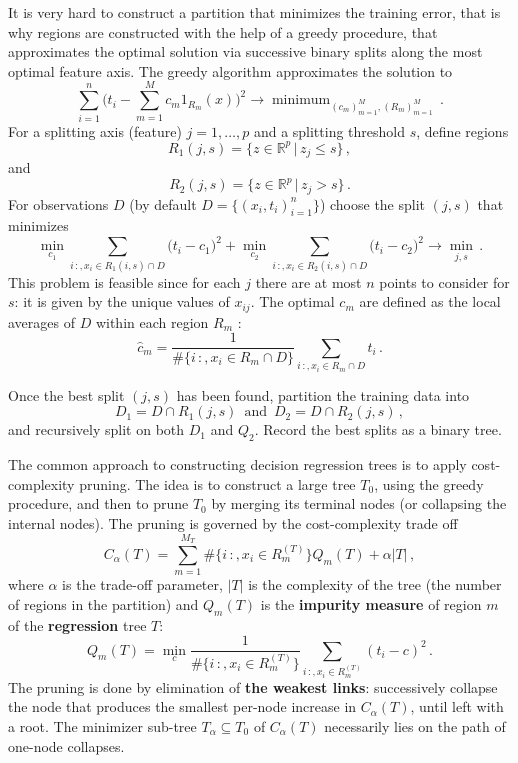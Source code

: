 \documentclass[a4paper]{article}
\newcommand{\Real}{\mathbb{R}}
\begin{document}
It is very hard to construct a partition that minimizes the training error, that is
why regions are constructed with the help of a greedy procedure, that approximates
the optimal solution via successive binary splits along the most optimal feature
axis. The greedy algorithm approximates the solution to
\[
\sum_{i=1}^n \bigl( t_i - \sum_{m=1}^M c_m 1_{R_m}(x) \bigr)^2
\to \mathop{\text{minimum}}_{(c_m)_{m=1}^M, (R_m)_{m=1}^M}\,.
\]
For a splitting axis (feature) $j=1,\ldots,p$ and a splitting threshold $s$, define
regions
\[ R_1(j,s) = \bigr\{ z \in \Real^p\,\big|\, z_j \leq s \bigr\} \,, \]
and
\[ R_2(j,s) = \bigr\{ z \in \Real^p\,\big|\, z_j > s \bigr\} \,. \]
For observations $D$ (by default $D = \{(x_i,t_i)_{i=1}^n\}$) choose the split
$(j,s)$ that minimizes
\[ 
  \min_{c_1} \sum_{i\,:,x_i\in R_1(i,s)\cap D} \bigl( t_i - c_1 \bigr)^2
+ \min_{c_2} \sum_{i\,:,x_i\in R_2(i,s)\cap D} \bigl( t_i - c_2 \bigr)^2
\to \min_{j,s}\,.
\]
This problem is feasible since for each $j$ there are at most $n$ points to consider
for $s$: it is given by the unique values of $x_{ij}$. The optimal $c_m$ are defined
as the local averages of $D$ within each region $R_m$ :
\[ \hat{c}_m = \frac{1}{\#\{i\,:,x_i\in R_m \cap D\}} \sum_{i\,:,x_i\in R_m \cap D} t_i \,. \]

Once the best split $(j,s)$ has been found, partition the training data into
\[ D_1 = D \cap R_1(j,s)\,\text{ and }\, D_2 = D \cap R_2(j,s)\,, \]
and recursively split on both $D_1$ and $Q_2$. Record the best splits as a binary
tree.

The common approach to constructing decision regression trees is to apply cost-complexity
pruning. The idea is to construct a large tree $T_0$, using the greedy procedure,
and then to prune $T_0$ by merging its terminal nodes (or collapsing the internal
nodes). The pruning is governed by the cost-complexity trade off
\[ C_\alpha(T) = \sum_{m=1}^{M_T} \#\{i\,:,x_i\in R^{(T)}_m\} Q_m(T) + \alpha |T|\,, \]
where $\alpha$ is the trade-off parameter, $|T|$ is the complexity of the tree (the
number of regions in the partition) and $Q_m(T)$ is the \textbf{impurity measure}
of region $m$ of the \textbf{regression} tree $T$:
\[
Q_m(T) = \min_c \frac{1}{\#\{i\,:,x_i\in R^{(T)}_m\}} \sum_{i\,:,x_i\in R^{(T)}_m} ( t_i - c )^2 \,.
\]
The pruning is done by elimination of \textbf{the weakest links}: successively collapse
the node that produces the smallest per-node increase in $C_\alpha(T)$, until left with
a root. The minimizer sub-tree $T_\alpha\subseteq T_0$ of $C_\alpha(T)$ necessarily lies
on the path of one-node collapses.
\end{document}
